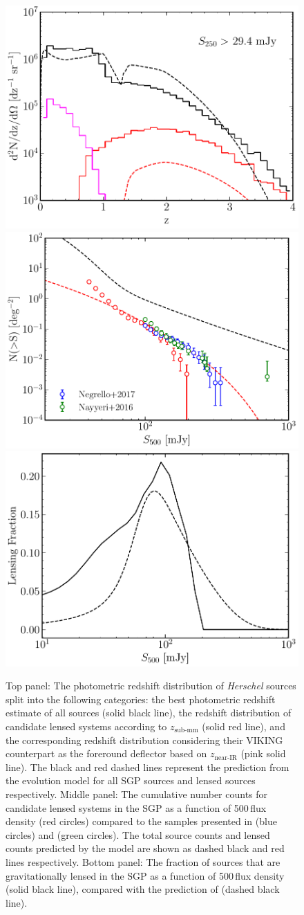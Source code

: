 \begin{figure}
    \centering
    \includegraphics[width=0.5\columnwidth,height=0.24\textheight]{Figures/lens_redshift_distribution.pdf}
    \includegraphics[width=0.5\columnwidth,height=0.24\textheight]{Figures/lens_number_counts.pdf}
    \includegraphics[width=0.5\columnwidth,height=0.24\textheight]{Figures/lensing_fraction.pdf}
    \caption{Top panel: The photometric redshift distribution of \textit{Herschel} sources split into the following categories: the best photometric redshift estimate of all sources (solid black line), the redshift distribution of candidate lensed systems according to $z_{\textrm{sub-mm}}$ (solid red line), and the corresponding redshift distribution considering their VIKING counterpart as the foreround deflector based on $z_{\textrm{near-IR}}$ (pink solid line). The black and red dashed lines represent the prediction from the \citealt{Cai_2013} evolution model for all SGP sources and lensed sources respectively. Middle panel: The cumulative number counts for candidate lensed systems in the SGP as a function of 500\,\micron flux density (red circles) compared to the samples presented in \citealt{Negrello_2017} (blue circles) and \citealt{Nayyeri_2016} (green circles). The total source counts and lensed counts predicted by the \citealt{Cai_2013} model are shown as dashed black and red lines respectively. Bottom panel: The fraction of sources that are gravitationally lensed in the SGP as a function of 500\,\micron flux density (solid black line), compared with the prediction of \citealt{Cai_2013} (dashed black line).
    \label{fig:lens_distributions_against_cai}}
\end{figure}

